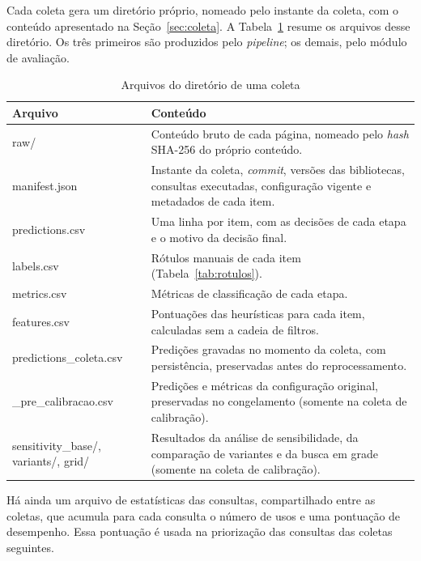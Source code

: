 Cada coleta gera um diretório próprio, nomeado pelo instante da coleta, com o
conteúdo apresentado na Seção~\ref{sec:coleta}. A
Tabela~\ref{tab:arquivos_coleta} resume os arquivos desse diretório. Os três
primeiros são produzidos pelo \textit{pipeline}; os demais, pelo módulo de
avaliação.

\begin{table}[htbp]
\centering
\caption{Arquivos do diretório de uma coleta}
\label{tab:arquivos_coleta}
\small
\begin{tabularx}{\textwidth}{>{\ttfamily}l X}
\toprule
\normalfont Arquivo & Conteúdo \\
\midrule
raw/            & Conteúdo bruto de cada página, nomeado pelo \textit{hash}
                  SHA-256 do próprio conteúdo. \\
manifest.json   & Instante da coleta, \textit{commit}, versões das
                  bibliotecas, consultas executadas, configuração vigente e
                  metadados de cada item. \\
predictions.csv & Uma linha por item, com as decisões de cada etapa e o motivo
                  da decisão final. \\
labels.csv      & Rótulos manuais de cada item (Tabela~\ref{tab:rotulos}). \\
metrics.csv     & Métricas de classificação de cada etapa. \\
features.csv    & Pontuações das heurísticas para cada item, calculadas sem a
                  cadeia de filtros. \\
predictions\_coleta.csv & Predições gravadas no momento da coleta, com
                  persistência, preservadas antes do reprocessamento. \\
*\_pre\_calibracao.csv & Predições e métricas da configuração original,
                  preservadas no congelamento (somente na coleta de
                  calibração). \\
sensitivity\_base/, variants/, grid/ & Resultados da análise de
                  sensibilidade, da comparação de variantes e da busca em
                  grade (somente na coleta de calibração). \\
\bottomrule
\end{tabularx}
\end{table}

Há ainda um arquivo de estatísticas das consultas, compartilhado entre as
coletas, que acumula para cada consulta o número de usos e uma pontuação de
desempenho. Essa pontuação é usada na priorização das consultas das coletas
seguintes.

